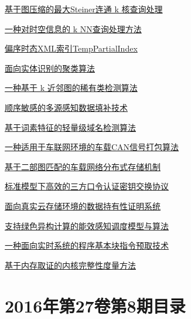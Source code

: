 \documentclass[a4paper]{article}
\begin{document}
\href{http://www.jos.org.cn/ch/reader/create_pdf.aspx?file_no=5044&year_id=2016&quarter_id=9&falg=1}{基于图压缩的最大Steiner连通 k 核查询处理}

\href{http://www.jos.org.cn/ch/reader/create_pdf.aspx?file_no=5046&year_id=2016&quarter_id=9&falg=1}{一种对时空信息的 k NN查询处理方法}

\href{http://www.jos.org.cn/ch/reader/create_pdf.aspx?file_no=4946&year_id=2016&quarter_id=9&falg=1}{偏序时态XML索引TempPartialIndex}

\href{http://www.jos.org.cn/ch/reader/create_pdf.aspx?file_no=5043&year_id=2016&quarter_id=9&falg=1}{面向实体识别的聚类算法}

\href{http://www.jos.org.cn/ch/reader/create_pdf.aspx?file_no=4872&year_id=2016&quarter_id=9&falg=1}{一种基于 k 近邻图的稀有类检测算法}

\href{http://www.jos.org.cn/ch/reader/create_pdf.aspx?file_no=5045&year_id=2016&quarter_id=9&falg=1}{顺序敏感的多源感知数据填补技术}

\href{http://www.jos.org.cn/ch/reader/create_pdf.aspx?file_no=4913&year_id=2016&quarter_id=9&falg=1}{基于词素特征的轻量级域名检测算法}

\href{http://www.jos.org.cn/ch/reader/create_pdf.aspx?file_no=5064&year_id=2016&quarter_id=9&falg=1}{一种适用于车联网环境的车载CAN信号打包算法}

\href{http://www.jos.org.cn/ch/reader/create_pdf.aspx?file_no=5065&year_id=2016&quarter_id=9&falg=1}{基于二部图匹配的车载网络分布式存储机制}

\href{http://www.jos.org.cn/ch/reader/create_pdf.aspx?file_no=4861&year_id=2016&quarter_id=9&falg=1}{标准模型下高效的三方口令认证密钥交换协议}

\href{http://www.jos.org.cn/ch/reader/create_pdf.aspx?file_no=4862&year_id=2016&quarter_id=9&falg=1}{面向真实云存储环境的数据持有性证明系统}

\href{http://www.jos.org.cn/ch/reader/create_pdf.aspx?file_no=4849&year_id=2016&quarter_id=9&falg=1}{支持绿色异构计算的能效感知调度模型与算法}

\href{http://www.jos.org.cn/ch/reader/create_pdf.aspx?file_no=4859&year_id=2016&quarter_id=9&falg=1}{一种面向实时系统的程序基本块指令预取技术}

\href{http://www.jos.org.cn/ch/reader/create_pdf.aspx?file_no=4875&year_id=2016&quarter_id=9&falg=1}{基于内存取证的内核完整性度量方法}


\section{\textbf{2016年第27卷第8期目录}}
\end{document}
